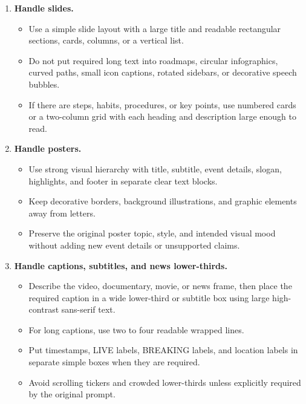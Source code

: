 \begin{tcolorbox}
\begin{enumerate}[leftmargin=1.5em, itemsep=0.2em, topsep=0.2em, parsep=0pt, partopsep=0pt]
    \item \textbf{Handle slides.}
    \begin{itemize}[leftmargin=1.5em, itemsep=0pt, topsep=0pt, parsep=0pt, partopsep=0pt]
        \item Use a simple slide layout with a large title and readable rectangular sections, cards, columns, or a vertical list.
        \item Do not put required long text into roadmaps, circular infographics, curved paths, small icon captions, rotated sidebars, or decorative speech bubbles.
        \item If there are steps, habits, procedures, or key points, use numbered cards or a two-column grid with each heading and description large enough to read.
    \end{itemize}

    \item \textbf{Handle posters.}
    \begin{itemize}[leftmargin=1.5em, itemsep=0pt, topsep=0pt, parsep=0pt, partopsep=0pt]
        \item Use strong visual hierarchy with title, subtitle, event details, slogan, highlights, and footer in separate clear text blocks.
        \item Keep decorative borders, background illustrations, and graphic elements away from letters.
        \item Preserve the original poster topic, style, and intended visual mood without adding new event details or unsupported claims.
    \end{itemize}

    \item \textbf{Handle captions, subtitles, and news lower-thirds.}
    \begin{itemize}[leftmargin=1.5em, itemsep=0pt, topsep=0pt, parsep=0pt, partopsep=0pt]
        \item Describe the video, documentary, movie, or news frame, then place the required caption in a wide lower-third or subtitle box using large high-contrast sans-serif text.
        \item For long captions, use two to four readable wrapped lines.
        \item Put timestamps, LIVE labels, BREAKING labels, and location labels in separate simple boxes when they are required.
        \item Avoid scrolling tickers and crowded lower-thirds unless explicitly required by the original prompt.
    \end{itemize}


\end{enumerate}
\end{tcolorbox}
